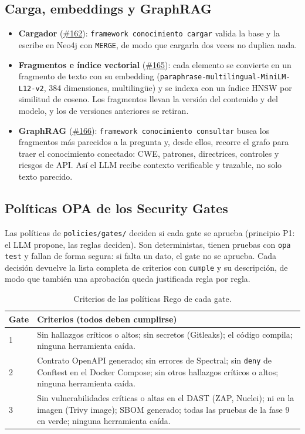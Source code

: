 \documentclass[11pt,a4paper]{report}
\newcommand{\pr}[1]{\href{https://github.com/PracticasESPE/Framework_Desarrollo_Seguro/pull/#1}{\##1}}
\begin{document}
\subsection{Carga, embeddings y GraphRAG}
\begin{itemize}
\item \textbf{Cargador} (\pr{162}): \texttt{framework conocimiento cargar} valida la base y la
escribe en Neo4j con \texttt{MERGE}, de modo que cargarla dos veces no duplica nada.
\item \textbf{Fragmentos e índice vectorial} (\pr{165}): cada elemento se convierte en un
fragmento de texto con su embedding (\texttt{paraphrase-multilingual-MiniLM-L12-v2}, 384
dimensiones, multilingüe) y se indexa con un índice HNSW por similitud de coseno. Los fragmentos
llevan la versión del contenido y del modelo, y los de versiones anteriores se retiran.
\item \textbf{GraphRAG} (\pr{166}): \texttt{framework conocimiento consultar} busca los fragmentos
más parecidos a la pregunta y, desde ellos, recorre el grafo para traer el conocimiento conectado:
CWE, patrones, directrices, controles y riesgos de API. Así el LLM recibe contexto verificable y
trazable, no solo texto parecido.
\end{itemize}

\subsection{Políticas OPA de los Security Gates}
Las políticas de \texttt{policies/gates/} deciden si cada gate se aprueba (principio P1: el LLM
propone, las reglas deciden). Son deterministas, tienen pruebas con \texttt{opa test} y fallan de
forma segura: si falta un dato, el gate no se aprueba. Cada decisión devuelve la lista completa de
criterios con \texttt{cumple} y su descripción, de modo que también una aprobación queda
justificada regla por regla.

\begin{table}[H]
\centering
\caption{Criterios de las políticas Rego de cada gate.}
\begin{tabularx}{\textwidth}{@{}P{1.2cm}L@{}}
\toprule
\textbf{Gate} & \textbf{Criterios (todos deben cumplirse)}\\
 & Sin hallazgos críticos o altos; sin secretos (Gitleaks); el código compila; ninguna herramienta caída.\\
2 & Contrato OpenAPI generado; sin errores de Spectral; sin \texttt{deny} de Conftest en el Docker Compose; sin otros hallazgos críticos o altos; ninguna herramienta caída.\\
3 & Sin vulnerabilidades críticas o altas en el DAST (ZAP, Nuclei); ni en la imagen (Trivy image); SBOM generado; todas las pruebas de la fase 9 en verde; ninguna herramienta caída.\\
\bottomrule
\end{tabularx}
\end{table}
\end{document}
